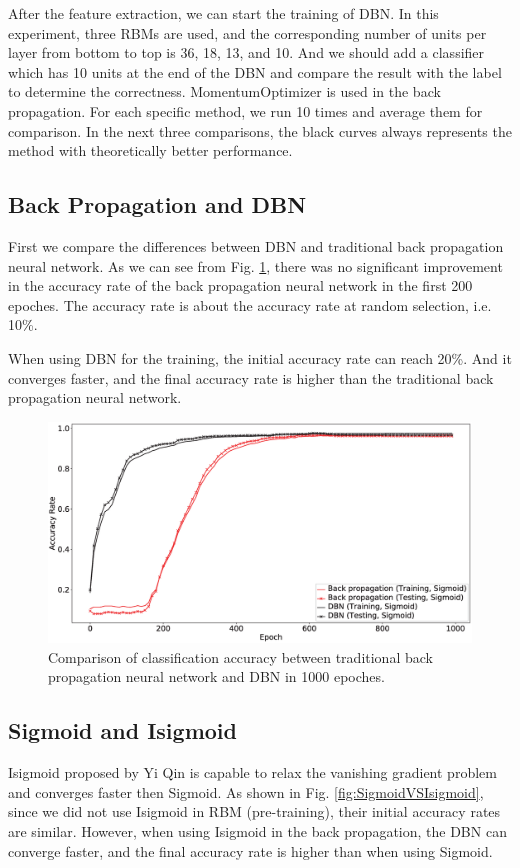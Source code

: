 \documentclass{modified}
\begin{document}
After the feature extraction, we can start the training of DBN. In this experiment, three RBMs are used, and the corresponding number of units per layer from bottom to top is 36, 18, 13, and 10. And we should add a classifier which has 10 units at the end of the DBN and compare the result with the label to determine the correctness. MomentumOptimizer is used in the back propagation. For each specific method, we run 10 times and average them for comparison. In the next three comparisons, the black curves always represents the method with theoretically better performance.

\subsection{Back Propagation and DBN}
First we compare the differences between DBN and traditional back propagation neural network. As we can see from Fig. \ref{fig:dbnVSbp}, there was no significant improvement in the accuracy rate of the back propagation neural network in the first 200 epoches. The accuracy rate is about the accuracy rate at random selection, i.e. 10\%. 

When using DBN for the training, the initial accuracy rate can reach 20\%. And it converges faster, and the final accuracy rate is higher than the traditional back propagation neural network.

\begin{figure}[htbp]
	\centering
	\includegraphics[width=\columnwidth]{dbnVSbp.eps}
	\caption{Comparison of classification accuracy between traditional back propagation neural network and DBN in 1000 epoches.}
	\label{fig:dbnVSbp}
\end{figure}

\subsection{Sigmoid and Isigmoid}
Isigmoid proposed by Yi Qin \cite{YiThe} is capable to relax the vanishing gradient problem and converges faster then Sigmoid. As shown in Fig. \ref{fig:SigmoidVSIsigmoid}, since we did not use Isigmoid in RBM (pre-training), their initial accuracy rates are similar. However, when using Isigmoid in the back propagation, the DBN can converge faster, and the final accuracy rate is higher than when using Sigmoid.
\end{document}
